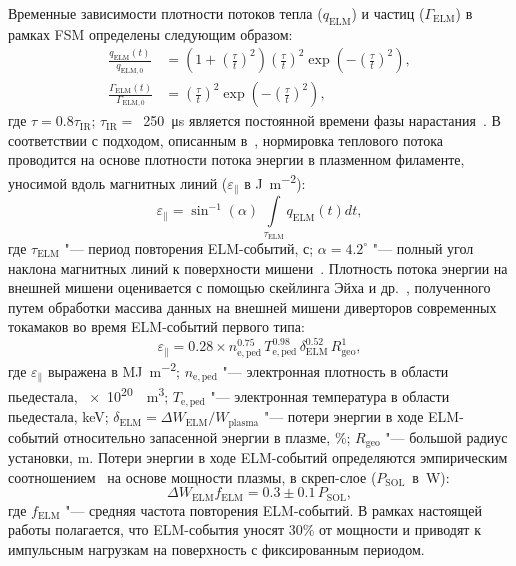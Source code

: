 Временные зависимости плотности потоков тепла (\( q_\mathrm{ELM} \)) и частиц (\( \Gamma_\mathrm{ELM} \)) в рамках FSM определены следующим образом:
\begin{subequations}
	\label{eq:ch3/elm_fluxes}
	\begin{align}
		\frac{q_{\mathrm{ELM}}(t)}{q_{\mathrm{ELM,0}}}           & =\left(1+\left(\frac{\tau}{t}\right)^2\right)\left(\frac{\tau}{t}\right)^2\exp\left(-\left(\frac{\tau}{t}\right)^2\right),\label{eq:elm_heat_flux} \\
		\frac{\Gamma_{\mathrm{ELM}}(t)}{\Gamma_{\mathrm{ELM,0}}} & =\left(\frac{\tau}{t}\right)^2\exp\left(-\left(\frac{\tau}{t}\right)^2\right), \label{eq:elm_part_flux}
	\end{align}
\end{subequations}
где $\tau=0.8\tau_{\mathrm{IR}}$; $\tau_{\mathrm{IR}}=$~\SI{250}{\micro\second} является постоянной времени фазы нарастания~\cite{Eich2017}. В соответствии с подходом, описанным в~\cite{VandenKerkhof2021}, нормировка теплового потока проводится на основе плотности потока энергии в плазменном филаменте, уносимой вдоль магнитных линий ($\varepsilon_\parallel$ в \si{\joule\per\meter\squared}):
\begin{equation}
	\label{eq:ch3/norm_elm_hf}
	\varepsilon_\parallel=\sin^{-1}(\alpha)\,\int\limits_{\tau_{\mathrm{ELM}}}q_{\mathrm{ELM}}(t)dt,
\end{equation}
где $\tau_{\mathrm{ELM}}$ "--- период повторения ELM-событий, с; $\alpha=4.2^{\circ}$ "--- полный угол наклона магнитных линий к поверхности мишени~\cite{Pitts2019, Eich2017, Pitts2017}. Плотность потока энергии на внешней мишени оценивается с помощью скейлинга Эйха и др.~\cite{Eich2017}, полученного путем обработки массива данных на внешней мишени диверторов современных токамаков во время ELM-событий первого типа:
\begin{equation}
	\label{eq:ch3/parallel_elm_fluence}
	\varepsilon_\parallel=0.28\times n_{\mathrm{e,ped}}^{0.75}\, T_{\mathrm{e,ped}}^{0.98}\, \delta_{\mathrm{ELM}}^{0.52}\, R_{\mathrm{geo}}^{1},
\end{equation}
где $\varepsilon_\parallel$ выражена в \si{\mega\joule\per\meter\squared}; $n_{\mathrm{e,ped}}$ "--- электронная плотность в области пьедестала, \SI{e20}{\per\meter\cubed}; $T_{\mathrm{e,ped}}$ "--- электронная температура в области пьедестала, \si{\kilo\electronvolt}; $\delta_{\mathrm{ELM}}=\Delta W_{\mathrm{ELM}}/W_{\mathrm{plasma}}$ "--- потери энергии в ходе ELM-событий относительно запасенной энергии в плазме, \si{\percent}; $R_{\mathrm{geo}}$ "--- большой радиус установки, \si{\meter}. Потери энергии в ходе ELM-событий определяются эмпирическим соотношением~\cite{Loarte2002} на основе мощности плазмы, в скреп-слое ($P_{\mathrm{SOL}}$~в~\si{\watt}):
\begin{equation}
	\Delta W_{\mathrm{ELM}} f_{\mathrm{ELM}}=0.3\pm 0.1 \, P_{\mathrm{SOL}},
\end{equation}
где $f_{\mathrm{ELM}}$ "--- средняя частота повторения ELM-событий. В рамках настоящей работы полагается, что ELM-события уносят 30\% от мощности и приводят к импульсным нагрузкам на поверхность с фиксированным периодом.

